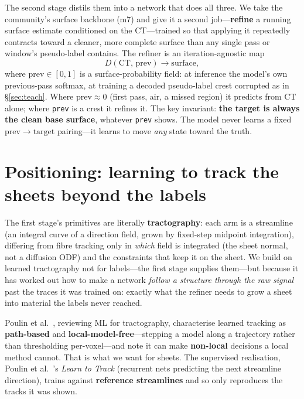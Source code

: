 \documentclass[10pt,twocolumn,a4paper]{article}
\newcommand{\code}[1]{\texttt{#1}}
\begin{document}
The second stage distils them into a network that does all three. We take the
community's surface backbone (m7) and give it a second job---\textbf{refine} a
running surface estimate conditioned on the CT---trained so that applying it
repeatedly contracts toward a cleaner, more complete surface than any single pass
or window's pseudo-label contains. The refiner is an iteration-agnostic map
\begin{equation}
  D(\mathrm{CT},\,\mathrm{prev}) \to \mathrm{surface},
\end{equation}
where $\mathrm{prev}\in[0,1]$ is a surface-probability field: at inference the
model's own previous-pass softmax, at training a decoded pseudo-label crest
corrupted as in \S\ref{sec:teach}. Where $\mathrm{prev}\approx0$ (first pass, air,
a missed region) it predicts from CT alone; where \code{prev} is a crest it refines
it. The key invariant: \textbf{the target is always the clean base surface},
whatever \code{prev} shows. The model never learns a fixed
$\mathrm{prev}\to\mathrm{target}$ pairing---it learns to move \emph{any} state
toward the truth.

\section{Positioning: learning to track the sheets beyond the labels}
The first stage's primitives are literally \textbf{tractography}: each arm is a
streamline (an integral curve of a direction field, grown by fixed-step midpoint
integration), differing from fibre tracking only in \emph{which} field is
integrated (the sheet normal, not a diffusion ODF) and the constraints that keep
it on the sheet. We build on learned tractography not for labels---the first stage
supplies them---but because it has worked out how to make a network \emph{follow a
structure through the raw signal} past the traces it was trained on: exactly what
the refiner needs to grow a sheet into material the labels never reached.

Poulin et al.~\cite{poulin2019}, reviewing ML for tractography, characterise
learned tracking as \textbf{path-based} and \textbf{local-model-free}---stepping a
model along a trajectory rather than thresholding per-voxel---and note it can make
\textbf{non-local} decisions a local method cannot. That is what we want for
sheets. The supervised realisation, Poulin et al.~\cite{poulin2017}'s \emph{Learn
to Track} (recurrent nets predicting the next streamline direction), trains
against \textbf{reference streamlines} and so only reproduces the tracks it was
shown.
\end{document}
